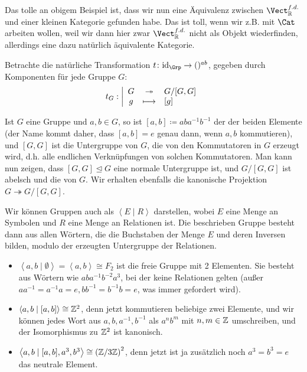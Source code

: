 \begin{oral}
    Das tolle an obigem Beispiel ist, dass wir nun eine Äquivalenz zwischen $\Vect_{\R}^{f.d.}$ und einer kleinen Kategorie gefunden habe. Das ist toll, wenn wir z.B. mit $\Cat$ arbeiten wollen, weil wir dann hier zwar  $\Vect_{\R}^{f.d.}$ nicht als Objekt wiederfinden, allerdings eine dazu natürlich äquivalente Kategorie.
\end{oral}

\begin{example}
    Betrachte die natürliche Transformation $t\colon \id_{\Grp} \to  ()^{ab}$, gegeben durch Komponenten für jede Gruppe $G$:
        \begin{equation*}
        t_G: \left| \begin{array}{c c l} 
            G & \twoheadrightarrow & G / [G,G] \\
            g & \longmapsto &  [g]
        \end{array} \right.
    \end{equation*}
\end{example}

\begin{recap}
    Ist $G$ eine Gruppe und  $a,b\in G$, so ist $[a,b] \coloneqq  aba^{-1}b^{-1}$ der  der beiden Elemente (der Name kommt daher, dass $[a,b] = e$ genau dann, wenn  $a,b$ kommutieren), und  $[G,G]$ ist die Untergruppe von  $G$, die von den Kommutatoren in $G$ erzeugt wird, d.h. alle endlichen Verknüpfungen von solchen Kommutatoren. Man kann nun zeigen, dass $[G,G]\unlhd G$ eine normale Untergruppe ist, und  $G / [G,G]$ ist abelsch und die   von $G$. Wir erhalten ebenfalls die kanonische Projektion $G \twoheadrightarrow G / [G,G]$.
\end{recap}

\begin{recap}
Wir können Gruppen auch als $\left< E \mid  R \right> $ darstellen, wobei $E$ eine Menge an Symbolen und  $R$ eine Menge an Relationen ist. Die beschrieben Gruppe besteht dann aus allen Wörtern, die die Buchstaben der Menge  $E$ und deren Inversen bilden, modulo der erzeugten Untergruppe der Relationen. \\
\begin{itemize}
    \item $\left< a,b \mid \emptyset \right>  = \left< a,b \right>  \cong F_2$ ist die freie Gruppe mit 2 Elementen. Sie besteht aus Wörtern wie $aba^{-1}b^{-2}a^3$, bei der keine Relationen gelten (außer $a a^{-1} = a^{-1}a = e, b b^{-1} = b^{-1} b = e$, was immer gefordert  wird).
    \item $\left< a,b \mid  [a,b] \right> \cong \mathbb{Z}^2$, denn jetzt kommutieren beliebige zwei Elemente, und wir können jedes Wort aus  $a,b,a^{-1},b^{-1}$ als $a^nb^m$ mit  $n,m \in \mathbb{Z}$ umschreiben, und der Isomorphismus zu $\mathbb{Z}^2$ ist kanonisch.
    \item $\left< a,b \mid  [a,b], a^3, b^3 \right> \cong \left( \mathbb{Z} / 3\mathbb{Z} \right) ^2$, denn jetzt ist ja zusätzlich noch $a^3 = b^3 = e$ das neutrale Element.
\end{itemize}
\end{recap}

